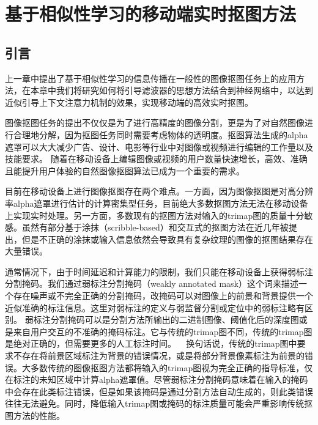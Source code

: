 \chapter{基于相似性学习的移动端实时抠图方法}
\section{引言}
上一章中提出了基于相似性学习的信息传播在一般性的图像抠图任务上的应用方法，在本章中我们将研究如何将引导滤波器的思想方法结合到神经网络中，以达到近似引导上下文注意力机制的效果，实现移动端的高效实时抠图。

图像抠图任务的提出不仅仅是为了进行高精度的图像分割，更是为了对自然图像进行合理地分解，因为抠图任务同时需要考虑物体的透明度。抠图算法生成的alpha遮罩可以大大减少广告、设计、电影等行业中对图像或视频进行编辑的工作量以及技能要求。
随着在移动设备上编辑图像或视频的用户数量快速增长，高效、准确且能提升用户体验的自然图像抠图算法已成为一个重要的需求。

目前在移动设备上进行图像抠图存在两个难点。一方面，因为图像抠图是对高分辨率alpha遮罩进行估计的计算密集型任务，目前绝大多数抠图方法\cite{levin2008closed,chen2013knn,cho2016natural,xu2017deep}无法在移动设备上实现实时处理。另一方面，多数现有的抠图方法对输入的trimap图的质量十分敏感。虽然有部分基于涂抹（scribble-based）\cite{lee2011nonlocal}和交互式\cite{yang2018active}的抠图方法在近几年被提出，但是不正确的涂抹或输入信息依然会导致具有复杂纹理的图像的抠图结果存在大量错误。

通常情况下，由于时间延迟和计算能力的限制，我们只能在移动设备上获得弱标注分割掩码。我们通过弱标注分割掩码（weakly annotated mask）这个词来描述一个存在噪声或不完全正确的分割掩码，改掩码可以对图像上的前景和背景提供一个近似准确的标注信息。这里对弱标注的定义与弱监督分割\cite{papandreou2015weakly}或定位\cite{oquab2015object}中的弱标注略有区别。
弱标注分割掩码可以是分割方法所输出的二进制图像、阈值化后的深度图或是来自用户交互的不准确的掩码标注。它与传统的trimap图不同，传统的trimap图是绝对正确的，但需要更多的人工标注时间。
  换句话说，传统的trimap图中要求不存在将前景区域标注为背景的错误情况，或是将部分背景像素标注为前景的错误。大多数传统的图像抠图方法都将输入的trimap图视为完全正确的指导标准，仅在标注的未知区域中计算alpha遮罩值。尽管弱标注分割掩码意味着在输入的掩码中会存在此类标注错误，但是如果该掩码是通过分割方法自动生成的，则此类错误往往无法避免。同时，降低输入trimap图或掩码的标注质量可能会严重影响传统抠图方法的性能。

